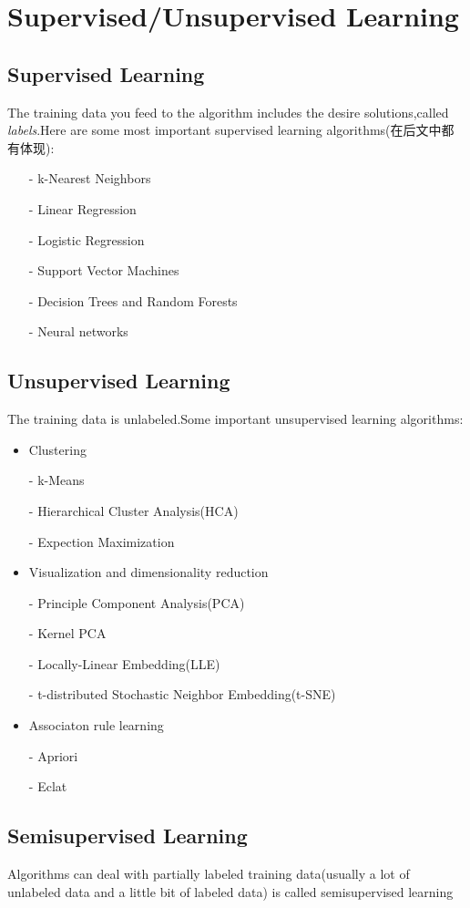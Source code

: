\documentclass[UTF8]{ctexart}
\begin{document}
\section{Supervised/Unsupervised Learning}
\subsection{Supervised Learning}

The training data you feed to the algorithm includes the desire solutions,called \emph{labels}.Here are some most important supervised learning algorithms(在后文中都有体现):

\begin{itemize}
	\item[-] k-Nearest Neighbors
	\item[-] Linear Regression
	\item[-] Logistic Regression
	\item[-] Support Vector Machines
	\item[-] Decision Trees and Random Forests
	\item[-] Neural networks
\end{itemize}

\subsection{Unsupervised Learning}

The training data is unlabeled.Some important unsupervised learning algorithms:
\begin{itemize}
	\item Clustering
	\item[-] k-Means
	\item[-] Hierarchical Cluster Analysis(HCA)
	\item[-] Expection Maximization
	\item Visualization and dimensionality reduction
	\item[-] Principle Component Analysis(PCA)
	\item[-] Kernel PCA
	\item[-] Locally-Linear Embedding(LLE)
	\item[-] t-distributed Stochastic Neighbor Embedding(t-SNE)
	\item Associaton rule learning
	\item[-] Apriori
	\item[-] Eclat
\end{itemize}

\subsection{Semisupervised Learning}
Algorithms can deal with partially labeled training data(usually a lot of unlabeled data and a little bit of labeled data) is called semisupervised learning
\end{document}
